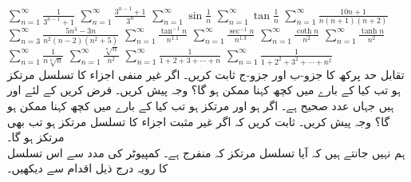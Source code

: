 $\sum\limits_{n=1}^{\infty}\frac{1}{3^{n-1}+1}$
$\sum\limits_{n=1}^{\infty}\frac{3^{n-1}+1}{3^n}$
$\sum\limits_{n=1}^{\infty}\sin\frac{1}{n}$
$\sum\limits_{n=1}^{\infty}\tan\frac{1}{n}$
$\sum\limits_{n=1}^{\infty}\frac{10n+1}{n(n+1)(n+2)}$
$\sum\limits_{n=3}^{\infty}\frac{5n^3-3n}{n^2(n-2)(n^2+5)}$
$\sum\limits_{n=1}^{\infty}\frac{\tan^{-1}n}{n^{1.1}}$
$\sum\limits_{n=1}^{\infty}\frac{\sec^{-1}n}{n^{1.3}}$
$\sum\limits_{n=1}^{\infty}\frac{\coth n}{n^2}$
$\sum\limits_{n=1}^{\infty}\frac{\tanh n}{n^2}$
$\sum\limits_{n=1}^{\infty}\frac{1}{n\sqrt[n]{n}}$
$\sum\limits_{n=1}^{\infty}\frac{\sqrt[n]{n}}{n^2}$
$\sum\limits_{n=1}^{\infty}\frac{1}{1+2+3+\cdots+n}$
$\sum\limits_{n=1}^{\infty}\frac{1}{1+2^2+3^2+\cdots+n^2}$
\\
تقابل حد پرکھ کا جزو-ب اور جزو-ج ثابت کریں۔ 
اگر غیر منفی اجزاء کا تسلسل  مرتکز ہو تب کیا  کے بارے میں کچھ کہنا ممکن ہو گا؟ وجہ پیش کریں۔
فرض کریں   کے لئے  اور  ہیں جہاں  عدد صحیح ہے۔ اگر  ہو اور  مرتکز ہو تب کیا  کے بارے میں کچھ کہنا ممکن ہو گا؟ وجہ پیش کریں۔
ثابت کریں کہ اگر غیر مثبت اجزاء کا تسلسل  مرتکز ہو تب  بھی مرتکز ہو گا۔
\\
ہم نہیں جانتے ہیں کہ آیا تسلسل  مرتکز کہ منفرج ہے۔ کمپیوٹر کی مدد سے اس تسلسل کا رویہ درج ذیل اقدام سے دیکھیں۔
